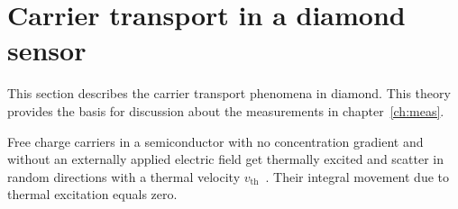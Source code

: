 \section{Carrier transport in a diamond sensor} 
This section describes the carrier transport phenomena in diamond. This theory provides the basis for discussion about the measurements in chapter~\ref{ch:meas}. 

Free charge carriers in a semiconductor with no concentration gradient and without an externally applied electric field get thermally excited and scatter in random directions with a thermal velocity $v_{\mathrm{th}}$~\cite{}. Their integral movement due to thermal excitation equals zero. 

